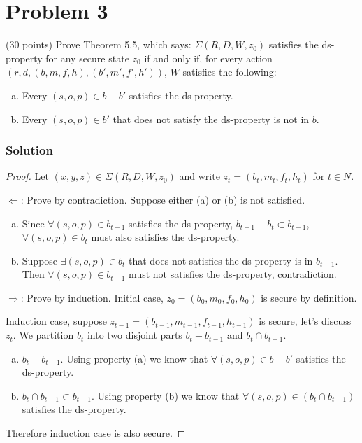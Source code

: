 \section*{Problem 3}

 (30 points) Prove Theorem 5.5, which says: $\Sigma(R, D, W, z_0)$ satisfies the ds-property for any secure state $z_0$ if and only if, for every action $(r, d, (b, m, f, h), (b', m', f', h'))$, $W$ satisfies the following:

\begin{enumerate}[(a)]
    \item Every $(s, o, p) \in b - b'$ satisfies the ds-property.
    \item Every $(s, o, p) \in b'$ that does not satisfy the ds-property is not in $b$.
\end{enumerate}
\subsubsection*{Solution}

\begin{proof}
    Let $(x, y, z) \in \Sigma(R, D, W, z_0)$ and write $z_t = (b_t, m_t, f_t, h_t)$ for $t \in N$.

    $\Leftarrow$: Prove by contradiction.
    Suppose either (a) or (b) is not satisfied.
    \begin{enumerate}[(a)]
        \item Since $\forall (s, o, p) \in b_{t-1}$ satisfies the ds-property, $b_{t-1} - b_t \subset b_{t-1}$, $\forall (s, o, p) \in b_t$ must also satisfies the ds-property.
        \item Suppose $\exists (s, o, p) \in b_{t}$ that does not satisfies the ds-property is in $b_{t-1}$.
              Then $\forall (s, o, p) \in b_{t-1}$ must not satisfies the ds-property, contradiction.
    \end{enumerate}

    $\Rightarrow$: Prove by induction.
    Initial case, $z_0 = (b_0, m_0, f_0, h_0)$ is secure by definition.

    Induction case, suppose $z_{t-1} = (b_{t-1}, m_{t-1}, f_{t-1}, h_{t-1})$ is secure, let's discuss $z_t$.
    We partition $b_t$ into two disjoint parts $b_t - b_{t-1}$ and $b_t \cap b_{t-1}$.

    \begin{enumerate}[(a)]
        \item $b_t - b_{t-1}$. Using property (a) we know that $\forall (s, o, p) \in b - b'$ satisfies the ds-property.
        \item $b_t \cap b_{t-1} \subset b_{t-1}$. Using property (b) we know that $\forall (s, o, p) \in (b_t \cap b_{t-1})$ satisfies the ds-property.
    \end{enumerate}

    Therefore induction case is also secure.
\end{proof}